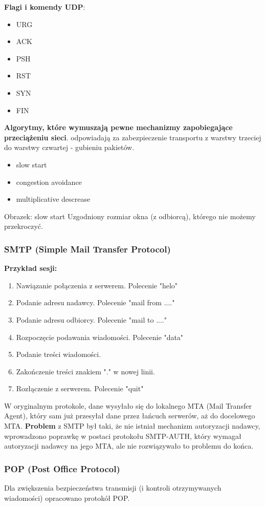 \textbf{Flagi i komendy UDP}:
\begin{itemize}
	\item URG
	\item ACK
	\item PSH
	\item RST
	\item SYN
	\item FIN
\end{itemize}

\textbf{Algorytmy, które wymuszają pewne mechanizmy zapobiegające przeciążeniu sieci}. odpowiadają za zabezpieczenie transportu z warstwy trzeciej do warstwy czwartej - gubieniu pakietów.
\begin{itemize}
	\item slow start
	\item congestion avoidance
	\item multiplicative descrease
\end{itemize}

Obrazek: slow start
Uzgodniony rozmiar okna (z odbiorcą), którego nie możemy przekroczyć.\\

\subsubsection{SMTP (Simple Mail Transfer Protocol)}
\textbf{Przykład sesji:}
\begin{enumerate}
	\item Nawiązanie połączenia z serwerem. Polecenie "helo"
	\item Podanie adresu nadawcy. Polecenie "mail from ...."
	\item Podanie adresu odbiorcy. Polecenie "mail to ...."
	\item Rozpoczęcie podawania wiadomości. Polecenie "data"
	\item Podanie treści wiadomości.
	\item Zakończenie treści znakiem "." w nowej linii.
	\item Rozłączenie z serwerem. Polecenie "quit"
\end{enumerate}

W oryginalnym protokole, dane wysyłało się do lokalnego MTA (Mail Transfer Agent), który sam już przesyłał dane przez łańcuch serwerów, aż do docelowego MTA. 
\textbf{Problem} z SMTP był taki, że nie istniał mechanizm autoryzacji nadawcy, wprowadzono poprawkę w postaci protokołu SMTP-AUTH, który wymagał autoryzacji nadawcy na jego MTA, ale nie rozwiązywało to problemu do końca.\\

\subsubsection{POP (Post Office Protocol)}
Dla zwiększenia bezpieczeństwa transmisji (i kontroli otrzymywanych wiadomości) opracowano protokół POP.